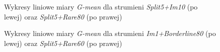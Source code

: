 \begin{figure}[h]
    \centering
    \qquad
    \caption{Wykresy liniowe miary \textit{G-mean} dla strumieni \textit{Split5+Im10} (po lewej) oraz \textit{Split5+Rare80} (po prawej)}\label{Figure:Split5Pairs}
\end{figure}

\begin{figure}[h]
    \centering
    \qquad
    \caption{Wykresy liniowe miary \textit{G-mean} dla strumieni \textit{Im1+Borderline80} (po lewej) oraz \textit{Split5+Rare60} (po prawej)}\label{Figure:PairsFactors}
\end{figure}


